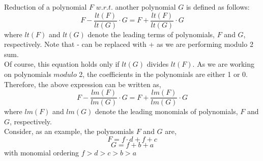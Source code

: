 \documentclass{article}
\begin{document}
Reduction of a polynomial $F$ $w.r.t.$ another polynomial $G$ is defined as follows:
\begin{equation}
F - \frac{lt(F)}{lt(G)} \cdot G = F + \frac{lt(F)}{lt(G)} \cdot G
\end{equation}
where $lt(F)$ and $lt(G)$ denote the leading terms of polynomials, $F$ and $G$, respectively. Note that - can be replaced with + as we are performing modulo 2 sum.\\
Of course, this equation holds only if $lt(G)$ divides $lt(F)$. As we are working on polynomials $modulo$ 2, the coefficients in the polynomials are either 1 or 0. Therefore, the above expression can be written as,
\begin{equation}
F - \frac{lm(F)}{lm(G)} \cdot G = F + \frac{lm(F)}{lm(G)} \cdot G
\end{equation}
where $lm(F)$ and $lm(G)$ denote the leading monomials of polynomials, $F$ and $G$, respectively. \\
Consider, as an example, the polynomials $F$ and $G$ are,
\begin{equation}
F = f\cdot d + f + c
\end{equation}
\begin{equation}
G = f + b + a
\end{equation}
with monomial ordering $f > d > c > b > a$
\end{document}
